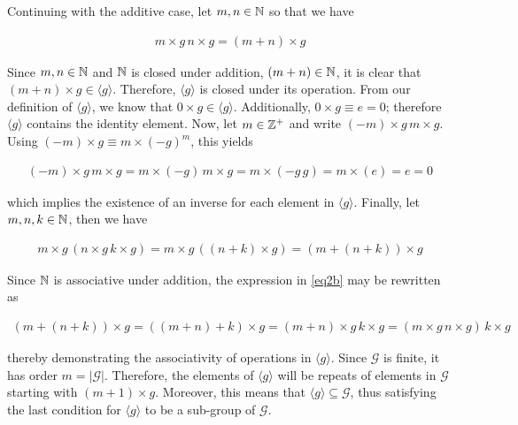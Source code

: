 \documentclass[../CryptoFinal.tex]{subfiles}
\begin{document}
\begin{flushleft}
Continuing with the additive case, let $m, n \in \mathbb{N}$ so that we have

\begin{align*}
  m \times g \, n \times g = \left( m + n \right) \times g
\end{align*}

Since $m, n \in \mathbb{N}$ and $\mathbb{N}$ is closed under addition, $\left( m + n \right) \in \mathbb{N}$, it is clear that $\left(m + n\right) \times g \in \langle g \rangle$.  Therefore, $\langle g \rangle$ is closed under its operation.  From our definition of $\langle g \rangle$, we know that $0 \times g \in \langle g \rangle$.  Additionally, $0 \times g \equiv e = 0$; therefore $\langle g \rangle$ contains the identity element.  Now, let $m \in \mathbb{Z}^+$ and write $\left(-m\right) \times g \, m \times g$.  Using $\left(-m\right) \times g \equiv m \times \left( - g \right)^m$, this yields

\begin{align*}
  \left(-m\right) \times g \, m \times g = m \times \left( -g \right) \, m \times g = m \times \left( -g \, g \right) = m \times \left( e \right) = e = 0
\end{align*}

which implies the existence of an inverse for each element in $\langle g \rangle$.  Finally, let $m, n, k \in \mathbb{N}$, then we have

\begin{align}
  m \times g \, \left( n \times g \, k \times g \right) = m \times g \, \left( \left(n+k\right) \times g \right) = \left(m + \left( n + k \right)\right) \times g \label{eq2b}
\end{align}

Since $\mathbb{N}$ is associative under addition, the expression in \ref{eq2b} may be rewritten as

\begin{align*}
  \left(m + \left( n + k \right)\right) \times g = \left( \left(m+n\right) + k \right) \times g = \left(m+n\right) \times g \, k \times g = \left( m \times g \, n \times g \right) \, k \times g
\end{align*}

thereby demonstrating the associativity of operations in $\langle g \rangle$.  Since $\mathcal{G}$ is finite, it has order $m = \lvert \mathcal{G} \rvert$.  Therefore, the elements of $\langle g \rangle$ will be repeats of elements in $\mathcal{G}$ starting with $\left(m+1\right) \times g$.  Moreover, this means that $\langle g \rangle \subseteq \mathcal{G}$, thus satisfying the last condition for $\langle g \rangle$ to be a sub-group of $\mathcal{G}$.



\end{flushleft}
\end{document}
